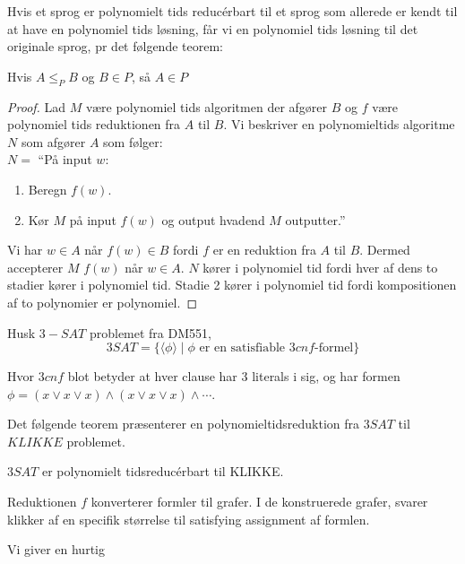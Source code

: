 Hvis et sprog er polynomielt tids reducérbart til et sprog som allerede er kendt til at have en polynomiel tids løsning, får vi en polynomiel tids løsning til det originale sprog, pr det følgende teorem:

\begin{theorem}
	Hvis $A \le_{P} B$ og $B \in P$, så $A \in P$
\end{theorem}

\begin{proof}
	Lad $M$ være polynomiel tids algoritmen der afgører $B$ og $f$ være polynomiel tids reduktionen fra $A$ til $B$. Vi beskriver en polynomieltids algoritme $N$ som afgører $A$ som følger:\\
	\noindent
	$N = $ ``På input $w$:
	\begin{enumerate}
		\item Beregn $f(w)$.
		\item Kør $M$ på input $f(w)$ og output hvadend $M$ outputter.''
	\end{enumerate}

	Vi har $w \in A$ når $f(w) \in B$ fordi $f$ er en reduktion fra $A$ til $B$. Dermed accepterer $M$ $f(w)$ når $w \in A$. $N$ kører i polynomiel tid fordi hver af dens to stadier kører i polynomiel tid. Stadie 2 kører i polynomiel tid fordi kompositionen af to polynomier er polynomiel.
\end{proof}

Husk $3-SAT$ problemet fra DM551,
\begin{equation*}
	3SAT = \{ \langle \phi \rangle \mid \phi \text{ er en satisfiable }3cnf\text{-formel}\}
\end{equation*}

Hvor $3cnf$ blot betyder at hver clause har 3 literals i sig, og har formen $\phi = (x \lor x \lor x) \land (x \lor x \lor x) \land \cdots$.

Det følgende teorem præsenterer en polynomieltidsreduktion fra $3SAT$ til $KLIKKE$ problemet.

\begin{theorem}
	$3SAT$ er polynomielt tidsreducérbart til KLIKKE.
\end{theorem}

Reduktionen $f$ konverterer formler til grafer. I de konstruerede grafer, svarer klikker af en specifik størrelse til satisfying assignment af formlen.

Vi giver en hurtig

